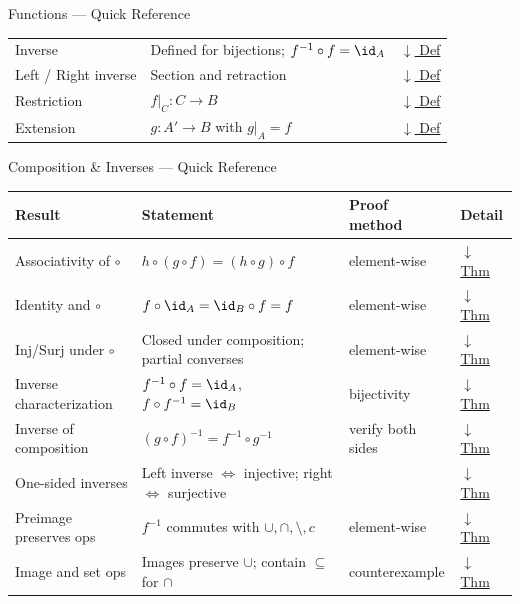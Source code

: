 \begin{toolkitbox}{Functions --- Quick Reference}
\begin{tabular}{l l l}
Inverse           & Defined for bijections; $f^{-1} \circ f = \id_A$            & \hyperref[def:inverse]{$\downarrow$ Def} \\
Left / Right inverse & Section and retraction                                  & \hyperref[def:left-right-inverse]{$\downarrow$ Def} \\
Restriction       & $f|_C : C \to B$                                            & \hyperref[def:restriction]{$\downarrow$ Def} \\
Extension         & $g : A' \to B$ with $g|_A = f$                              & \hyperref[def:extension]{$\downarrow$ Def} \\
\bottomrule
\end{tabular}
\end{toolkitbox}



\begin{toolkitbox}{Composition \& Inverses --- Quick Reference}
\small
\begin{tabular}{l l l l}
\toprule
\textbf{Result} & \textbf{Statement} & \textbf{Proof method} & \textbf{Detail} \\
\midrule
Associativity of $\circ$ & $h \circ (g \circ f) = (h \circ g) \circ f$ & element-wise & \hyperref[thm:comp-assoc]{$\downarrow$ Thm} \\
Identity and $\circ$     & $f \circ \id_A = \id_B \circ f = f$          & element-wise & \hyperref[thm:comp-id]{$\downarrow$ Thm} \\
Inj/Surj under $\circ$   & Closed under composition; partial converses  & element-wise & \hyperref[thm:comp-inj-surj]{$\downarrow$ Thm} \\
Inverse characterization & $f^{-1}\circ f = \id_A$, $f \circ f^{-1} = \id_B$ & bijectivity & \hyperref[thm:inverse-char]{$\downarrow$ Thm} \\
Inverse of composition   & $(g \circ f)^{-1} = f^{-1} \circ g^{-1}$    & verify both sides & \hyperref[thm:inverse-comp]{$\downarrow$ Thm} \\
One-sided inverses       & Left inverse $\iff$ injective; right $\iff$ surjective & & \hyperref[thm:one-sided]{$\downarrow$ Thm} \\
Preimage preserves ops   & $f^{-1}$ commutes with $\cup,\cap,\setminus,c$ & element-wise & \hyperref[thm:preimage-ops]{$\downarrow$ Thm} \\
Image and set ops        & Images preserve $\cup$; contain $\subseteq$ for $\cap$ & counterexample & \hyperref[thm:image-ops]{$\downarrow$ Thm} \\
\bottomrule
\end{tabular}
\end{toolkitbox}


